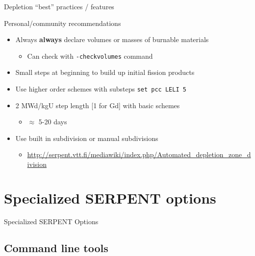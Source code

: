 \documentclass{beamer}
\begin{document}
\begin{frame}{Depletion ``best'' practices / features}
    \centerline{Personal/community recommendations}
    \begin{itemize}
        \item Always \textbf{always} declare volumes or masses of burnable materials
        \begin{itemize}
            \item Can check with \texttt{-checkvolumes} command
        \end{itemize}
        \item Small steps at beginning to build up initial fission products
        \item Use higher order schemes with substeps \texttt{set pcc LELI 5}
        \item 2 MWd/kgU step length [1 for Gd] with basic schemes
        \begin{itemize}
            \item $\approx$ 5-20 days
        \end{itemize}
        \item Use built in subdivision or manual subdivisions
        \begin{itemize}
            \item \url{http://serpent.vtt.fi/mediawiki/index.php/Automated\_depletion\_zone\_division}
        \end{itemize}
    \end{itemize}
\end{frame}

\section{Specialized SERPENT options}

\begin{frame}{Specialized SERPENT Options}
    \tableofcontents[sectionstyle=show/hide,subsectionstyle=show/show/hide]
\end{frame}

\subsection{Command line tools}
\end{document}
